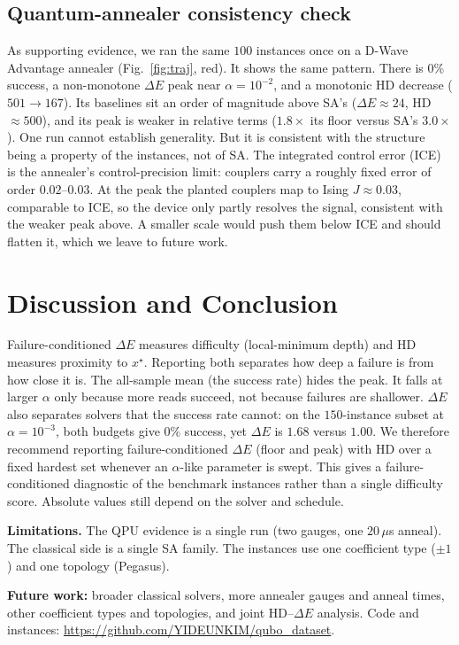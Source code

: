 \documentclass[10pt, conference]{IEEEtran}
\begin{document}
\subsection{Quantum-annealer consistency check}
\label{sec:qpu}
As supporting evidence, we ran the same $100$ instances once on a D-Wave
Advantage annealer (Fig.~\ref{fig:traj}, red). It shows the same pattern. There
is $0\%$ success, a non-monotone $\Delta E$ peak near $\alpha{=}10^{-2}$, and a
monotonic HD decrease ($501\to167$). Its baselines sit an order of magnitude
above SA's ($\Delta E\approx24$, HD$\approx500$), and its peak is weaker in
relative terms ($1.8\times$ its floor versus SA's $3.0\times$). One run cannot
establish generality. But it is consistent with the structure being a property
of the instances, not of SA. The integrated control error (ICE) is the
annealer's control-precision limit: couplers carry a roughly fixed error of
order $0.02$--$0.03$. At the peak the planted couplers map to Ising
$J\approx0.03$, comparable to ICE, so the device only partly resolves the
signal, consistent with the weaker peak above. A smaller scale would push them
below ICE and should flatten it, which we leave to future work.

\section{Discussion and Conclusion}
Failure-conditioned $\Delta E$ measures difficulty (local-minimum depth) and
HD measures proximity to $x^\star$. Reporting both separates how deep a failure
is from how close it is. The all-sample mean (the success rate) hides the peak.
It falls at larger $\alpha$ only because more reads succeed, not because failures
are shallower. $\Delta E$ also separates solvers that the
success rate cannot: on the $150$-instance subset at $\alpha{=}10^{-3}$, both
budgets give $0\%$ success, yet $\Delta E$ is $1.68$ versus $1.00$. We therefore recommend
reporting failure-conditioned $\Delta E$ (floor and peak) with HD over a fixed
hardest set whenever an $\alpha$-like parameter is swept. This gives a
failure-conditioned diagnostic of the benchmark instances rather than a single
difficulty score. Absolute values still depend on the solver and schedule.

\textbf{Limitations.} The QPU evidence is a single run (two gauges, one
$20\,\mu$s anneal). The classical side is a single SA family. The instances use
one coefficient type ($\pm1$) and one topology (Pegasus).

\textbf{Future work:} broader classical solvers, more annealer gauges and
anneal times, other coefficient types and topologies, and joint
HD--$\Delta E$ analysis. Code and instances:
\url{https://github.com/YIDEUNKIM/qubo_dataset}.
\end{document}
